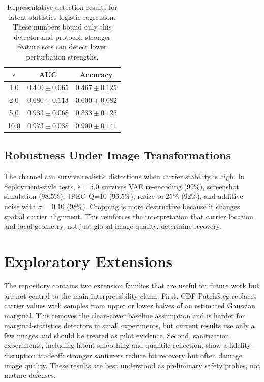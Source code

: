 \documentclass{article}
\begin{document}
\begin{table}[t]
\caption{Representative detection results for latent-statistics logistic regression. These numbers bound only this detector and protocol; stronger feature sets can detect lower perturbation strengths.}
\label{tab:detect}
\centering
\begin{small}
\begin{tabular}{ccc}
\toprule
$\epsilon$ & AUC & Accuracy \\
\midrule
1.0 & $0.440 \pm 0.065$ & $0.467 \pm 0.125$ \\
2.0 & $0.680 \pm 0.113$ & $0.600 \pm 0.082$ \\
5.0 & $0.933 \pm 0.068$ & $0.833 \pm 0.125$ \\
10.0 & $0.973 \pm 0.038$ & $0.900 \pm 0.141$ \\
\bottomrule
\end{tabular}
\end{small}
\end{table}

\subsection{Robustness Under Image Transformations}

The channel can survive realistic distortions when carrier stability is high. In deployment-style tests, $\epsilon=5.0$ survives VAE re-encoding (99\%), screenshot simulation (98.5\%), JPEG Q=10 (96.5\%), resize to 25\% (92\%), and additive noise with $\sigma=0.10$ (98\%). Cropping is more destructive because it changes spatial carrier alignment. This reinforces the interpretation that carrier location and local geometry, not just global image quality, determine recovery.

\section{Exploratory Extensions}
\label{sec:extensions}

The repository contains two extension families that are useful for future work but are not central to the main interpretability claim. First, CDF-PatchSteg replaces carrier values with samples from upper or lower halves of an estimated Gaussian marginal. This removes the clean-cover baseline assumption and is harder for marginal-statistics detectors in small experiments, but current results use only a few images and should be treated as pilot evidence. Second, sanitization experiments, including latent smoothing and quantile reflection, show a fidelity--disruption tradeoff: stronger sanitizers reduce bit recovery but often damage image quality. These results are best understood as preliminary safety probes, not mature defenses.
\end{document}
